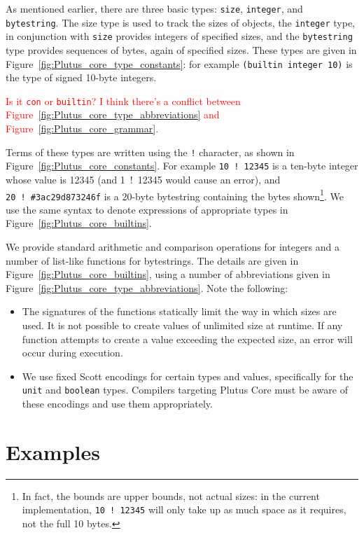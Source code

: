 \documentclass[a4paper]{article}
\newcommand{\red}[1]{\textcolor{red}{#1}}
\begin{document}
As mentioned earlier, there are three basic types: \texttt{size},
\texttt{integer}, and \texttt{bytestring}.  The \textrm{size} type is
used to track the sizes of objects, the \texttt{integer} type, in
conjunction with \texttt{size} provides integers of specified sizes,
and the \texttt{bytestring} type provides sequences of bytes, again of
specified sizes.  These types are given in
Figure~\ref{fig:Plutus_core_type_constants}:  for example 
\texttt{(builtin integer 10)} is the type of signed 10-byte integers.

\red{Is it \texttt{con} or \texttt{builtin}?  I think there's a 
conflict between Figure~\ref{fig:Plutus_core_type_abbreviations}
and Figure~\ref{fig:Plutus_core_grammar}.}

Terms of these types are written using the \texttt{!} character, as
shown in Figure~\ref{fig:Plutus_core_constants}.  For example
\texttt{10~!~12345} is a ten-byte integer whose value is 12345 (and
\textrm{1~!~12345} would cause an error), and \texttt{20~!~\#3ac29d873246f} 
is a 20-byte bytestring containing the bytes
shown\footnote{In fact, the bounds are upper bounds, not actual sizes:
  in the current implementation, \texttt{10~!~12345} will only take up
  as much space as it requires, not the full 10 bytes.}.  We use the
same syntax to denote expressions of appropriate types in
Figure~\ref{fig:Plutus_core_builtins}.

We provide standard arithmetic and comparison operations for integers
and a number of list-like functions for bytestrings. The details are
given in Figure~\ref{fig:Plutus_core_builtins}, using a number of
abbreviations given in Figure~\ref{fig:Plutus_core_type_abbreviations}.
Note the following:
\begin{itemize}
\item The signatures of the functions statically limit the way in
  which sizes are used.  It is not possible to create values of
  unlimited size at runtime.  If any function attempts to create a
  value exceeding the expected size, an error will occur during execution.
\item We use fixed Scott encodings for certain types and values,
  specifically for the \texttt{unit} and \texttt{boolean} types.
Compilers targeting Plutus Core must be aware of these encodings and
use them appropriately.
\end{itemize}

\newpage



\section{Examples}
\end{document}

